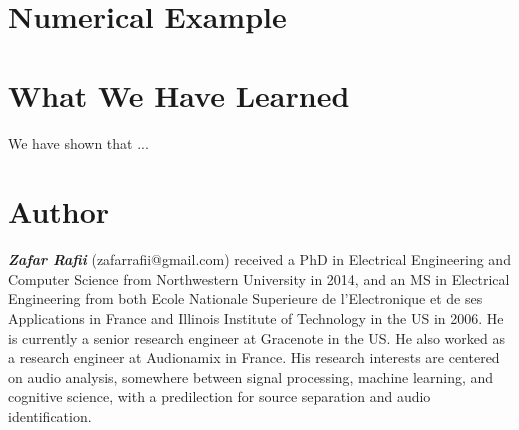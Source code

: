 \documentclass[journal]{IEEEtran}
\begin{document}
\section{Numerical Example}

%




\section{What We Have Learned}

We have shown that ...



\section{Author}

\textit{\textbf{Zafar Rafii}} (zafarrafii@gmail.com) received a PhD in Electrical Engineering and Computer Science from Northwestern University in 2014, and an MS in Electrical Engineering from both Ecole Nationale Superieure de l’Electronique et de ses Applications in France and Illinois Institute of Technology in the US in 2006. He is currently a senior research engineer at Gracenote in the US. He also worked as a research engineer at Audionamix in France. His research interests are centered on audio analysis, somewhere between signal processing, machine learning, and cognitive science, with a predilection for source separation and audio identification.



\end{document}
